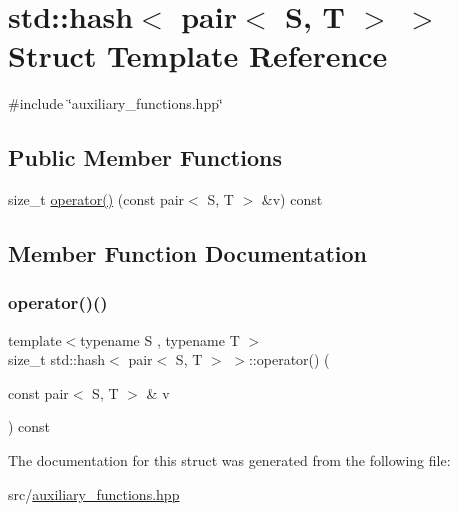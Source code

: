 \hypertarget{structstd_1_1hash_3_01pair_3_01S_00_01T_01_4_01_4}{}\section{std\+:\+:hash$<$ pair$<$ S, T $>$ $>$ Struct Template Reference}
\label{structstd_1_1hash_3_01pair_3_01S_00_01T_01_4_01_4}


{\ttfamily \#include \char`\"{}auxiliary\+\_\+functions.\+hpp\char`\"{}}

\subsection*{Public Member Functions}
\begin{DoxyCompactItemize}
\item 
size\+\_\+t \mbox{\hyperlink{structstd_1_1hash_3_01pair_3_01S_00_01T_01_4_01_4_a6fec6cb26e96fb20d4ec121487e5acb4}{operator()}} (const pair$<$ S, T $>$ \&v) const
\end{DoxyCompactItemize}


\subsection{Member Function Documentation}
\mbox{\label{structstd_1_1hash_3_01pair_3_01S_00_01T_01_4_01_4_a6fec6cb26e96fb20d4ec121487e5acb4}} 
\subsubsection{\texorpdfstring{operator()()}{operator()()}}
{\footnotesize\ttfamily template$<$typename S , typename T $>$ \\
size\+\_\+t std\+::hash$<$ pair$<$ S, T $>$ $>$\+::operator() (\begin{DoxyParamCaption}\item[{const pair$<$ S, T $>$ \&}]{v }\end{DoxyParamCaption}) const\hspace{0.3cm}{\ttfamily [inline]}}



The documentation for this struct was generated from the following file\+:\begin{DoxyCompactItemize}
\item 
src/\mbox{\hyperlink{auxiliary__functions_8hpp}{auxiliary\+\_\+functions.\+hpp}}\end{DoxyCompactItemize}
